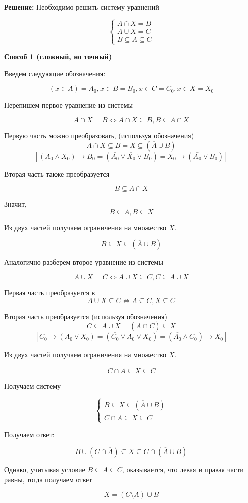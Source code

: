 \documentclass{article}
\begin{document}
\textbf{Решение:}
Необходимо решить систему уравнений 

$$\begin{cases} A \cap X = B \\ A \cup X = C \\ B \subseteq A \subseteq C \end{cases}$$

\textbf{Способ 1 (сложный, но точный)}

Введем следующие обозначения: 

$$ (x \in A) = A_0, x \in B = B_0, x \in C = C_0, x \in X = X_0$$

Перепишем первое уравнение из системы

$$ A \cap X = B  \iff A \cap X \subseteq B , B \subseteq A \cap X$$

Первую часть можно преобразовать, (используя обозначения) 
$$A \cap X \subseteq B = X \subseteq (\overline{A} \cup B)$$
$$[(A_0 \wedge X_0) \rightarrow B_0 = (\overline{A_0} \vee \overline{X_0} \vee B_0) = X_0 \rightarrow (\overline{A_0} \vee B_0 ) ]$$

Вторая часть также преобразуется 

$$  B \subseteq A \cap X$$ 

Значит, $$ B \subseteq A , B \subseteq X$$

Из двух частей получаем ограничения на множество $X$.

$$B \subseteq X \subseteq (\overline{A} \cup B)$$ 

Аналогично разберем второе уравнение из системы

$$ A \cup X = C  \iff A \cup X \subseteq C , C \subseteq A \cup X$$

Первая часть преобразуется в 
$$A \cup X \subseteq C \iff A \subseteq C, X \subseteq C$$

Вторая часть преобразуется (используя обозначения)
$$C \subseteq A \cup X = (\overline{A} \cap C) \subseteq X $$
$$[C_0 \rightarrow (A_0 \vee X_0) = (\overline{C_0} \vee A_0 \vee X_0) = (\overline{A_0} \wedge C_0 ) \rightarrow X_0 ]$$

Из двух частей получаем ограничения на множество $X$.

$$C \cap \overline{A} \subseteq X \subseteq C$$ 

Получаем систему 

$$\begin{cases} B \subseteq X \subseteq (\overline{A} \cup B) \\ C \cap \overline{A} \subseteq X \subseteq C \end{cases}$$

Получаем ответ:

$$ B \cup (C \cap \overline{A}) \subseteq X \subseteq C \cap (\overline{A} \cup B)$$

Однако, учитывая условие $B \subseteq A \subseteq C$, оказывается, что левая и правая части равны, тогда получаем ответ

$$X = (C \setminus A) \cup B$$
\end{document}
